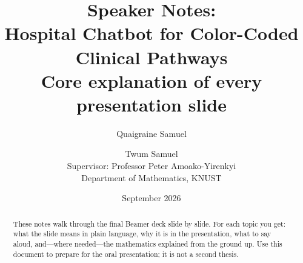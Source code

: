 \documentclass[11pt,a4paper]{article}
\title{Speaker Notes:\\Hospital Chatbot for Color-Coded Clinical Pathways\\[0.4em]
\large Core explanation of every presentation slide}
\author{Quaigraine Samuel \and Twum Samuel\\
\small Supervisor: Professor Peter Amoako-Yirenkyi\\
Department of Mathematics, KNUST}
\date{September 2026}
\begin{document}
\maketitle

\begin{abstract}
These notes walk through the final Beamer deck slide by slide.
For each topic you get: what the slide means in plain language,
why it is in the presentation, what to say aloud, and---where needed---the mathematics
explained from the ground up. Use this document to prepare for the oral presentation;
it is not a second thesis.
\end{abstract}

\tableofcontents
\newpage











\end{document}
